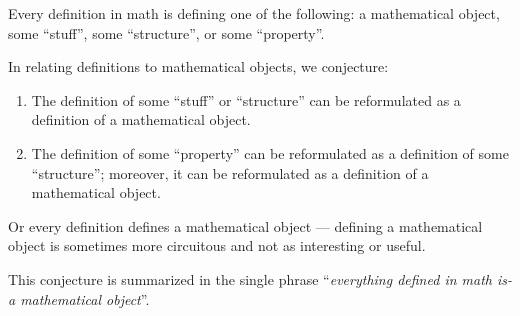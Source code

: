 \begin{prop}
Every definition in math is defining one of the following: a
mathematical object, some ``stuff'', some ``structure'', or some
``property''.
\end{prop}
\begin{con} In relating definitions to mathematical objects, we
  conjecture:
\begin{enumerate}
\item The definition of some ``stuff'' or ``structure'' can be
  reformulated as a definition of a mathematical object.
\item The definition of some ``property'' can be reformulated as
  a definition of some ``structure''; moreover, it can be
  reformulated as a definition of a mathematical object.
\end{enumerate}
Or every definition defines a mathematical
object --- defining a mathematical object is sometimes more
circuitous and not as interesting or useful. 
\end{con}
This conjecture is summarized in the single phrase
``\emph{everything defined in math is-a mathematical object}''.
